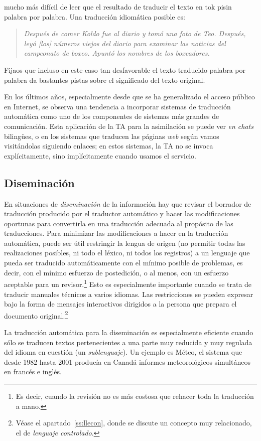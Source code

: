 mucho más difícil de leer que el resultado de traducir el texto en tok pisin palabra por palabra. Una traducción idiomática posible es: \begin{quote}{\sl Después de comer Koldo fue al diario y tomó una foto de Teo. Después, leyó [los] números viejos del diario para examinar las noticias del campeonato de boxeo. Apuntó los nombres de los boxeadores.} \end{quote} Fijaos que incluso en este caso tan desfavorable el texto traducido palabra por palabra da bastantes pistas sobre el significado del texto original. 

En los últimos años, especialmente desde que se ha generalizado el acceso público en Internet, se observa una tendencia a incorporar sistemas de traducción automática como uno de los componentes de sistemas más grandes de comunicación. Esta aplicación de la TA para la asimilación se puede ver \emph{en chats} bilingües, o en los sistemas que traducen las páginas \emph{web} según vamos visitándolas siguiendo enlaces; en estos sistemas, la TA no se invoca explícitamente, sino implícitamente cuando usamos el servicio. 

\subsection{Diseminación} En situaciones de \emph{diseminación} de la información hay que revisar el borrador de traducción producido por el traductor automático y hacer las modificaciones oportunas para convertirla en una traducción adecuada al propósito de las traducciones. Para minimizar las modificaciones a hacer en la traducción automática, puede ser útil restringir la lengua de origen (no permitir todas las realizaciones posibles, ni todo el léxico, ni todos los registros) a un lenguaje que pueda ser traducido automáticamente con el mínimo posible de problemas, es decir, con el mínimo esfuerzo de postedición, o al menos, con un esfuerzo aceptable para un revisor.\footnote{Es decir, cuando la revisión no es más costosa que rehacer toda la traducción a mano.} Esto es especialmente importante cuando se trata de traducir manuales técnicos a varios idiomas. Las restricciones se pueden expresar bajo la forma de mensajes interactivos dirigidos a la persona que prepara el documento original.\footnote{Véase el apartado~\ref{ss:llecon}, donde se discute un concepto muy relacionado, el de \emph{lenguaje controlado}.} 

La traducción automática para la diseminación es especialmente eficiente cuando sólo se traducen textos pertenecientes a una parte muy reducida y muy regulada del idioma en cuestión (un \emph{sublenguaje}). Un ejemplo es Méteo, el sistema que desde 1982 hasta 2001 producía en Canadá informes meteorológicos simultáneos en francés e inglés. 

